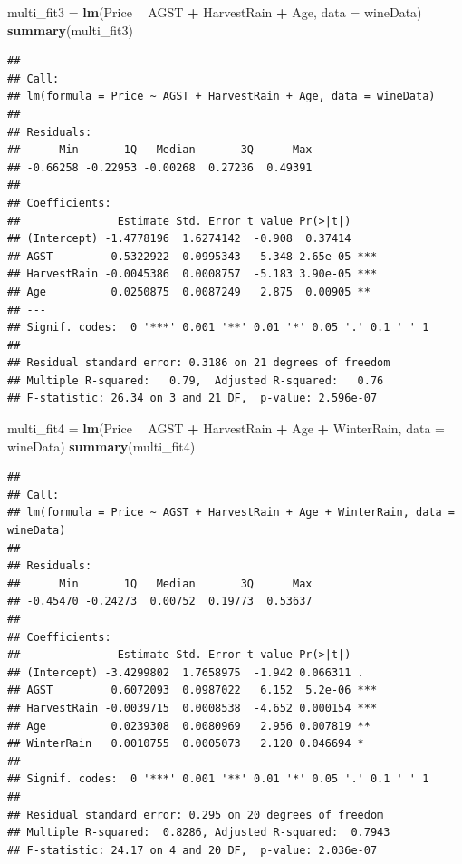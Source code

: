 \documentclass[
]{article}
\newenvironment{Shaded}{\begin{snugshade}}{\end{snugshade}}
\newcommand{\DataTypeTok}[1]{\textcolor[rgb]{0.13,0.29,0.53}{#1}}
\newcommand{\KeywordTok}[1]{\textcolor[rgb]{0.13,0.29,0.53}{\textbf{#1}}}
\newcommand{\NormalTok}[1]{#1}
\newcommand{\OperatorTok}[1]{\textcolor[rgb]{0.81,0.36,0.00}{\textbf{#1}}}
\newcommand{\StringTok}[1]{\textcolor[rgb]{0.31,0.60,0.02}{#1}}
\begin{document}
\begin{Shaded}
\begin{Highlighting}[]
\NormalTok{multi_fit3 =}\StringTok{ }\KeywordTok{lm}\NormalTok{(Price }\OperatorTok{~}\StringTok{ }\NormalTok{AGST }\OperatorTok{+}\StringTok{ }\NormalTok{HarvestRain }\OperatorTok{+}\StringTok{ }\NormalTok{Age, }\DataTypeTok{data =}\NormalTok{ wineData)}
\KeywordTok{summary}\NormalTok{(multi_fit3)}
\end{Highlighting}
\end{Shaded}

\begin{verbatim}
## 
## Call:
## lm(formula = Price ~ AGST + HarvestRain + Age, data = wineData)
## 
## Residuals:
##      Min       1Q   Median       3Q      Max 
## -0.66258 -0.22953 -0.00268  0.27236  0.49391 
## 
## Coefficients:
##               Estimate Std. Error t value Pr(>|t|)    
## (Intercept) -1.4778196  1.6274142  -0.908  0.37414    
## AGST         0.5322922  0.0995343   5.348 2.65e-05 ***
## HarvestRain -0.0045386  0.0008757  -5.183 3.90e-05 ***
## Age          0.0250875  0.0087249   2.875  0.00905 ** 
## ---
## Signif. codes:  0 '***' 0.001 '**' 0.01 '*' 0.05 '.' 0.1 ' ' 1
## 
## Residual standard error: 0.3186 on 21 degrees of freedom
## Multiple R-squared:   0.79,  Adjusted R-squared:   0.76 
## F-statistic: 26.34 on 3 and 21 DF,  p-value: 2.596e-07
\end{verbatim}

\begin{Shaded}
\begin{Highlighting}[]
\NormalTok{multi_fit4 =}\StringTok{ }\KeywordTok{lm}\NormalTok{(Price }\OperatorTok{~}\StringTok{ }\NormalTok{AGST }\OperatorTok{+}\StringTok{ }\NormalTok{HarvestRain }\OperatorTok{+}\StringTok{ }\NormalTok{Age }\OperatorTok{+}\StringTok{ }\NormalTok{WinterRain, }\DataTypeTok{data =}\NormalTok{ wineData)}
\KeywordTok{summary}\NormalTok{(multi_fit4)}
\end{Highlighting}
\end{Shaded}

\begin{verbatim}
## 
## Call:
## lm(formula = Price ~ AGST + HarvestRain + Age + WinterRain, data = wineData)
## 
## Residuals:
##      Min       1Q   Median       3Q      Max 
## -0.45470 -0.24273  0.00752  0.19773  0.53637 
## 
## Coefficients:
##               Estimate Std. Error t value Pr(>|t|)    
## (Intercept) -3.4299802  1.7658975  -1.942 0.066311 .  
## AGST         0.6072093  0.0987022   6.152  5.2e-06 ***
## HarvestRain -0.0039715  0.0008538  -4.652 0.000154 ***
## Age          0.0239308  0.0080969   2.956 0.007819 ** 
## WinterRain   0.0010755  0.0005073   2.120 0.046694 *  
## ---
## Signif. codes:  0 '***' 0.001 '**' 0.01 '*' 0.05 '.' 0.1 ' ' 1
## 
## Residual standard error: 0.295 on 20 degrees of freedom
## Multiple R-squared:  0.8286, Adjusted R-squared:  0.7943 
## F-statistic: 24.17 on 4 and 20 DF,  p-value: 2.036e-07
\end{verbatim}
\end{document}

